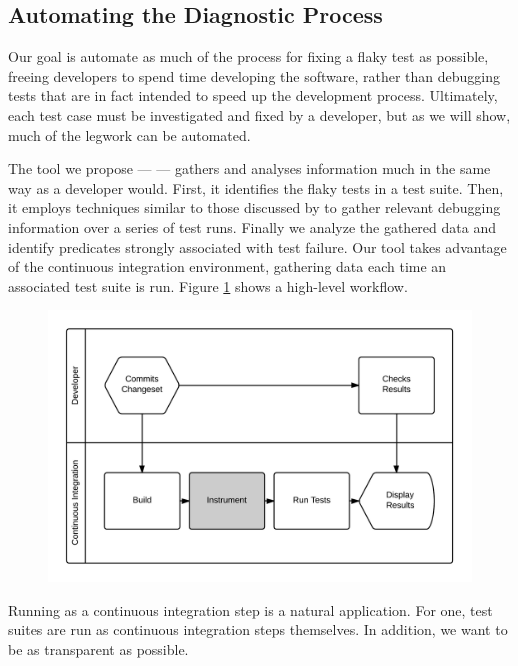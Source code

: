 \subsection{Automating the Diagnostic Process}

Our goal is automate as much of the process for fixing a flaky test as possible, freeing developers to spend time developing the software, rather than debugging tests that are in fact intended to speed up the development process. Ultimately, each test case must be investigated and fixed by a developer, but as we will show, much of the legwork can be automated.

The tool we propose --- \emph{\splatter} --- gathers and analyses information much in the same way as a developer would. First, it identifies the flaky tests in a test suite. Then, it employs techniques similar to those discussed by \citet{ArumugaNainar:2010:ABI:1806799.1806839} to gather relevant debugging information over a series of test runs. Finally we analyze the gathered data and identify predicates strongly associated with test failure. Our tool takes advantage of the continuous integration environment, gathering data each time an associated test suite is run. Figure \ref{fig:developer_workflow} shows a high-level \splatter workflow.

\begin{figure}[h]
\includegraphics[width=\linewidth]{Images/developer_workflow}
\caption{}
\label{fig:developer_workflow}
\end{figure}

Running as a continuous integration step is a natural application. For one, test suites are run as continuous integration steps themselves. In addition, we want to be as transparent as possible.

